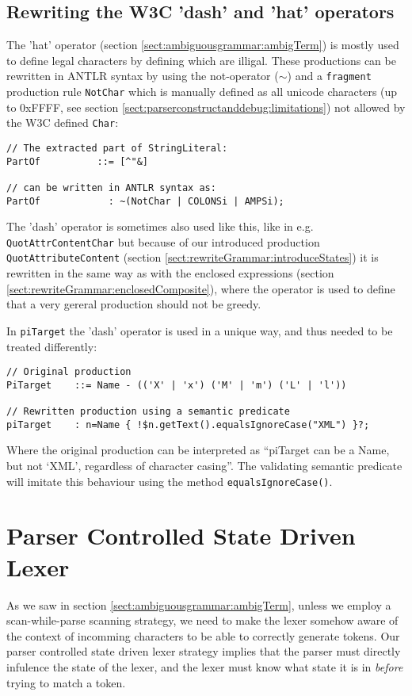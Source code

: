 \subsection{Rewriting the W3C 'dash' and 'hat' operators}
The 'hat' operator (section \ref{sect:ambiguousgrammar:ambigTerm}) is mostly used to define legal characters by defining which are illigal. These productions can be rewritten in ANTLR syntax by using the not-operator ($\sim$) and a \verb!fragment! production rule \verb!NotChar! which is manually defined as all unicode characters (up to 0xFFFF, see section \ref{sect:parserconstructanddebug:limitations}) not allowed by the W3C defined \verb!Char!:
\begin{verbatim}
// The extracted part of StringLiteral:
PartOf          ::= [^"&]

// can be written in ANTLR syntax as:
PartOf            : ~(NotChar | COLONSi | AMPSi);
\end{verbatim}
The 'dash' operator is sometimes also used like this, like in e.g. \verb!QuotAttrContentChar! but because of our introduced production \verb!QuotAttributeContent! (section \ref{sect:rewriteGrammar:introduceStates}) it is rewritten in the same way as with the enclosed expressions (section \ref{sect:rewriteGrammar:enclosedComposite}), where the operator is used to define that a very gereral production should not be greedy. 

In \verb!piTarget! the 'dash' operator is used in a unique way, and thus needed to be treated differently:
\begin{verbatim}
// Original production
PiTarget    ::= Name - (('X' | 'x') ('M' | 'm') ('L' | 'l'))

// Rewritten production using a semantic predicate
piTarget    : n=Name { !$n.getText().equalsIgnoreCase("XML") }?;
\end{verbatim}
Where the original production can be interpreted as ``piTarget can be a Name, but not `XML', regardless of character casing''. The validating semantic predicate will imitate this behaviour using the method \verb!equalsIgnoreCase()!.

\section{Parser Controlled State Driven Lexer}
As we saw in section \ref{sect:ambiguousgrammar:ambigTerm}, unless we employ a scan-while-parse scanning strategy, we need to make the lexer somehow aware of the context of incomming characters to be able to correctly generate tokens. Our parser controlled state driven lexer strategy implies that the parser must directly infulence the state of the lexer, and the lexer must know what state it is in \emph{before} trying to match a token. 

